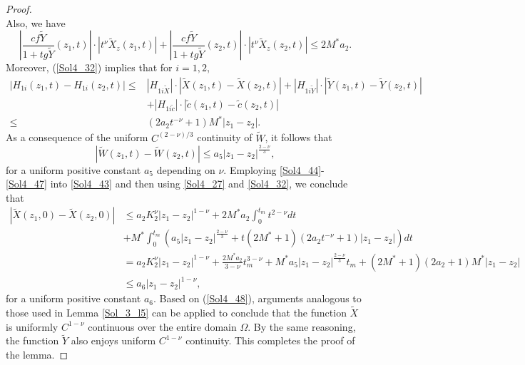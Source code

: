 \documentclass[10pt,a4paper]{amsart}
\begin{document}
\begin{proof}
\begin{equation}
     \end{equation}
     Also, we have
     \begin{equation*}\label{Sol4_45}
         \left|\frac{cf\widetilde Y}{1+tg\widetilde Y}(z_1,t)\right| \cdot|t^\nu\widetilde X_z(z_1,t)|+ \left|\frac{cf\widetilde Y}{1+tg\widetilde Y}(z_2,t)\right| \cdot|t^\nu\widetilde X_z(z_2,t)|\leq 2M^*a_2.
     \end{equation*}
     Moreover, (\ref{Sol4_32}) implies that for $i=1,2$,
     \begin{equation*}\label{Sol4_46}
         \begin{split}
             |H_{1i}(z_1,t)-H_{1i}(z_2,t)|\leq& |H_{1i\widetilde X}|\cdot |\widetilde X(z_1,t)-\widetilde X(z_2,t)|+|H_{1i\widetilde Y}|\cdot |\widetilde Y(z_1,t)-\widetilde Y(z_2,t)|\\
             &+|H_{1i\tilde c}|\cdot |\tilde c(z_1,t)-\tilde c(z_2,t)|\\
             \leq &\left(2a_2t^{-\nu}+1 \right)M^*|z_1-z_2|.
         \end{split}
     \end{equation*}
     As a consequence of the uniform $C^{(2-\nu)/3}$ continuity of $\widetilde W$, it follows that
     \begin{equation}\label{Sol4_47}
         |\widetilde W(z_1,t)-\widetilde W(z_2,t)|\leq a_5|z_1-z_2|^{\frac{2-\nu}{3}},
     \end{equation}
     for a uniform positive constant $a_5$ depending on $\nu$. Employing \eqref{Sol4_44}-\eqref{Sol4_47} into \eqref{Sol4_43} and then using \eqref{Sol4_27} and \eqref{Sol4_32}, we conclude that
     \begin{equation}\label{Sol4_48}
         \begin{split}
              |\widetilde X(z_1,0)-\widetilde X(z_2,0)|&\leq a_2K_2^\nu|z_1-z_2|^{1-\nu}+2M^*a_2\int_0^{t_m} t^{2-\nu} dt\\
              &+M^*\int_0^{t_m} \left(a_5|z_1-z_2|^{\frac{2-\nu}{3}}+t(2M^*+1)(2a_2t^{-\nu}+1)|z_1-z_2| \right)dt\\
              &= a_2K_2^\nu|z_1-z_2|^{1-\nu}+\frac{2M^*a_2}{3-\nu}t_m^{3-\nu} +M^*a_5|z_1-z_2|^{\frac{2-\nu}{3}}t_m+(2M^*+1)(2a_2+1)M^*|z_1-z_2|\\&\leq a_6|z_1-z_2|^{1-\nu},
         \end{split}
     \end{equation}
     for a uniform positive constant $a_6$. Based on (\ref{Sol4_48}), arguments analogous to those used in Lemma \ref{Sol_3_l5} can be applied to conclude that the function $\widetilde X$ is uniformly $C^{1-\nu}$ continuous over the entire domain $\Omega$. By the same reasoning, the function $\widetilde Y$ also enjoys uniform $C^{1-\nu}$ continuity. This completes the proof of the lemma.
 \end{proof}
\end{document}
